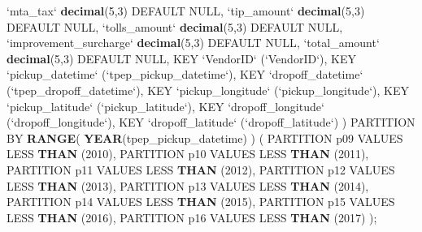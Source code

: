 \documentclass[12pt,twoside]{reedthesis}
\newenvironment{Shaded}{\begin{snugshade}}{\end{snugshade}}
\newcommand{\KeywordTok}[1]{\textcolor[rgb]{0.13,0.29,0.53}{\textbf{#1}}}
\newcommand{\DataTypeTok}[1]{\textcolor[rgb]{0.13,0.29,0.53}{#1}}
\newcommand{\DecValTok}[1]{\textcolor[rgb]{0.00,0.00,0.81}{#1}}
\newcommand{\StringTok}[1]{\textcolor[rgb]{0.31,0.60,0.02}{#1}}
\newcommand{\OtherTok}[1]{\textcolor[rgb]{0.56,0.35,0.01}{#1}}
\newcommand{\NormalTok}[1]{#1}
\theoremstyle{definition}
\theoremstyle{definition}
\theoremstyle{definition}
\theoremstyle{remark}
\begin{document}
\begin{Shaded}
\begin{Highlighting}[]
 \StringTok{`}\DataTypeTok{mta_tax}\StringTok{`} \KeywordTok{decimal}\NormalTok{(}\DecValTok{5}\NormalTok{,}\DecValTok{3}\NormalTok{) DEFAULT }\OtherTok{NULL}\NormalTok{,}
 \StringTok{`}\DataTypeTok{tip_amount}\StringTok{`} \KeywordTok{decimal}\NormalTok{(}\DecValTok{5}\NormalTok{,}\DecValTok{3}\NormalTok{) DEFAULT }\OtherTok{NULL}\NormalTok{,}
 \StringTok{`}\DataTypeTok{tolls_amount}\StringTok{`} \KeywordTok{decimal}\NormalTok{(}\DecValTok{5}\NormalTok{,}\DecValTok{3}\NormalTok{) DEFAULT }\OtherTok{NULL}\NormalTok{,}
 \StringTok{`}\DataTypeTok{improvement_surcharge}\StringTok{`} \KeywordTok{decimal}\NormalTok{(}\DecValTok{5}\NormalTok{,}\DecValTok{3}\NormalTok{) DEFAULT }\OtherTok{NULL}\NormalTok{,}
 \StringTok{`}\DataTypeTok{total_amount}\StringTok{`} \KeywordTok{decimal}\NormalTok{(}\DecValTok{5}\NormalTok{,}\DecValTok{3}\NormalTok{) DEFAULT }\OtherTok{NULL}\NormalTok{,}
\NormalTok{ KEY }\StringTok{`}\DataTypeTok{VendorID}\StringTok{`}\NormalTok{ (}\StringTok{`}\DataTypeTok{VendorID}\StringTok{`}\NormalTok{),}
\NormalTok{ KEY }\StringTok{`}\DataTypeTok{pickup_datetime}\StringTok{`}\NormalTok{ (}\StringTok{`}\DataTypeTok{tpep_pickup_datetime}\StringTok{`}\NormalTok{),}
\NormalTok{ KEY }\StringTok{`}\DataTypeTok{dropoff_datetime}\StringTok{`}\NormalTok{ (}\StringTok{`}\DataTypeTok{tpep_dropoff_datetime}\StringTok{`}\NormalTok{),}
\NormalTok{ KEY }\StringTok{`}\DataTypeTok{pickup_longitude}\StringTok{`}\NormalTok{ (}\StringTok{`}\DataTypeTok{pickup_longitude}\StringTok{`}\NormalTok{),}
\NormalTok{ KEY }\StringTok{`}\DataTypeTok{pickup_latitude}\StringTok{`}\NormalTok{ (}\StringTok{`}\DataTypeTok{pickup_latitude}\StringTok{`}\NormalTok{),}
\NormalTok{ KEY }\StringTok{`}\DataTypeTok{dropoff_longitude}\StringTok{`}\NormalTok{ (}\StringTok{`}\DataTypeTok{dropoff_longitude}\StringTok{`}\NormalTok{),}
\NormalTok{ KEY }\StringTok{`}\DataTypeTok{dropoff_latitude}\StringTok{`}\NormalTok{ (}\StringTok{`}\DataTypeTok{dropoff_latitude}\StringTok{`}\NormalTok{)}
\NormalTok{)}
\NormalTok{PARTITION BY }\KeywordTok{RANGE}\NormalTok{( }\KeywordTok{YEAR}\NormalTok{(tpep_pickup_datetime) ) (}
\NormalTok{  PARTITION p09 VALUES LESS }\KeywordTok{THAN}\NormalTok{ (}\DecValTok{2010}\NormalTok{),}
\NormalTok{  PARTITION p10 VALUES LESS }\KeywordTok{THAN}\NormalTok{ (}\DecValTok{2011}\NormalTok{),}
\NormalTok{  PARTITION p11 VALUES LESS }\KeywordTok{THAN}\NormalTok{ (}\DecValTok{2012}\NormalTok{),}
\NormalTok{  PARTITION p12 VALUES LESS }\KeywordTok{THAN}\NormalTok{ (}\DecValTok{2013}\NormalTok{),}
\NormalTok{  PARTITION p13 VALUES LESS }\KeywordTok{THAN}\NormalTok{ (}\DecValTok{2014}\NormalTok{),}
\NormalTok{  PARTITION p14 VALUES LESS }\KeywordTok{THAN}\NormalTok{ (}\DecValTok{2015}\NormalTok{),}
\NormalTok{  PARTITION p15 VALUES LESS }\KeywordTok{THAN}\NormalTok{ (}\DecValTok{2016}\NormalTok{),}
\NormalTok{  PARTITION p16 VALUES LESS }\KeywordTok{THAN}\NormalTok{ (}\DecValTok{2017}\NormalTok{)}
\NormalTok{);}


\end{Highlighting}
\end{Shaded}
\end{document}
